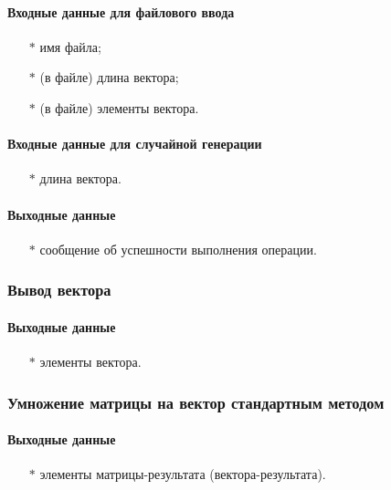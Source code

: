 \documentclass[a4paper,12pt]{extarticle}
\begin{document}
\paragraph{Входные данные для файлового ввода}
\begin{itemize}
    \item[$*$] имя файла;
    \item[$*$] (в файле) длина вектора;
    \item[$*$] (в файле) элементы вектора.
\end{itemize}

\paragraph{Входные данные для случайной генерации}
\begin{itemize}
    \item[$*$] длина вектора.
\end{itemize}

\paragraph{Выходные данные}
\begin{itemize}
    \item[$*$] сообщение об успешности выполнения операции.
\end{itemize}

\subsubsection{Вывод вектора}
\paragraph{Выходные данные}
\begin{itemize}
    \item[$*$] элементы вектора.
\end{itemize}

\subsubsection{Умножение матрицы на вектор стандартным методом}
\paragraph{Выходные данные}
\begin{itemize}
    \item[$*$] элементы матрицы-результата (вектора-результата).
\end{itemize}
\end{document}
